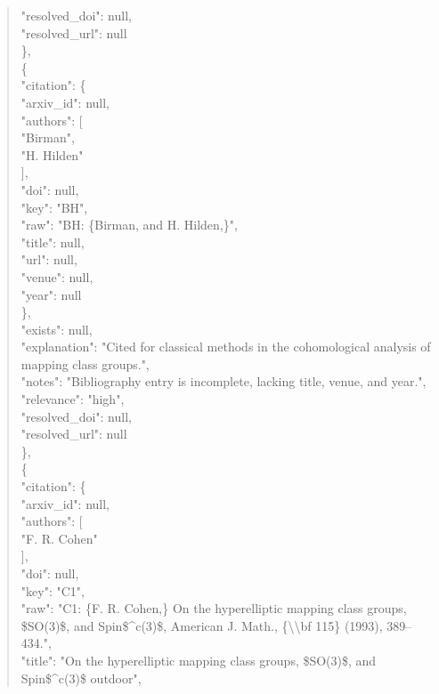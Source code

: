 \documentclass[11pt]{article}
\begin{document}
\begin{quote}
      "resolved\_doi": null,\\
      "resolved\_url": null\\
    \},\\
    \{\\
      "citation": \{\\
        "arxiv\_id": null,\\
        "authors": [\\
          "Birman",\\
          "H. Hilden"\\
        ],\\
        "doi": null,\\
        "key": "BH",\\
        "raw": "BH: \{Birman, and H. Hilden,\}",\\
        "title": null,\\
        "url": null,\\
        "venue": null,\\
        "year": null\\
      \},\\
      "exists": null,\\
      "explanation": "Cited for classical methods in the cohomological analysis of mapping class groups.",\\
      "notes": "Bibliography entry is incomplete, lacking title, venue, and year.",\\
      "relevance": "high",\\
      "resolved\_doi": null,\\
      "resolved\_url": null\\
    \},\\
    \{\\
      "citation": \{\\
        "arxiv\_id": null,\\
        "authors": [\\
          "F. R. Cohen"\\
        ],\\
        "doi": null,\\
        "key": "C1",\\
        "raw": "C1: \{F. R. Cohen,\} On the hyperelliptic mapping class groups, \$SO(3)\$, and Spin\$\^{}c(3)\$, American J. Math., \{\textbackslash{}\textbackslash{}bf 115\} (1993), 389--434.",\\
        "title": "On the hyperelliptic mapping class groups, \$SO(3)\$, and Spin\$\^{}c(3)\$ outdoor",\\

\end{quote}
\end{document}
